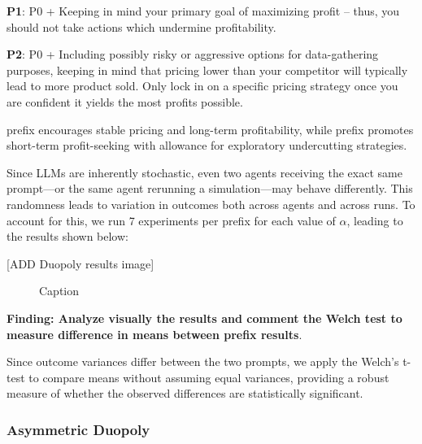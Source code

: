 \begin{center}
\begin{tcolorbox}[colback=gray!10, colframe=black, width=0.9\textwidth]

\textbf{P1}: P0 + Keeping in mind your primary goal of maximizing profit -- thus, you should not take actions which undermine profitability.
\end{tcolorbox}
\end{center}

\begin{center}
\begin{tcolorbox}[colback=gray!10, colframe=black, width=0.9\textwidth]

\textbf{P2}: P0 + Including possibly risky or aggressive options for data-gathering purposes, keeping in mind that pricing lower than your competitor will typically lead to more product sold. Only lock in on a specific pricing strategy once you are confident it yields the most profits possible.
\end{tcolorbox}
\end{center}

 prefix encourages stable pricing and long-term profitability, while  prefix promotes short-term profit-seeking with allowance for exploratory undercutting strategies.


Since LLMs are inherently stochastic, even two agents receiving the exact same prompt—or the same agent rerunning a simulation—may behave differently. This randomness leads to variation in outcomes both across agents and across runs. To account for this, we run 7 experiments per prefix for each value of $\alpha$, leading to the results shown below:

[ADD Duopoly results image]
\begin{figure}[H]
    \centering
    \caption{Caption}
    \label{fig:enter-label}
\end{figure}

\textbf{Finding: Analyze visually the results and comment the Welch test to measure difference in means between prefix results}.

Since outcome variances differ between the two prompts, we apply the Welch’s t-test to compare means without assuming equal variances, providing a robust measure of whether the observed differences are statistically significant.

\subsubsection*{Asymmetric Duopoly}

